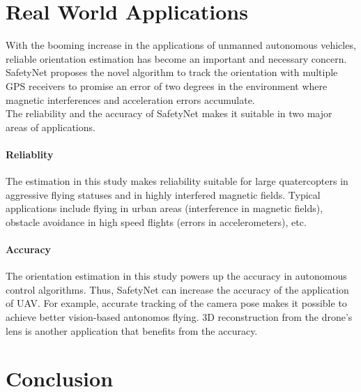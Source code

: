 \documentclass[journal,onecolumn]{IEEEtran}
\begin{document}
\section{Real World Applications}
With the booming increase in the applications of unmanned autonomous vehicles, reliable orientation estimation has become an important and necessary concern. SafetyNet proposes the novel algorithm to track the orientation with multiple GPS receivers to promise an error of two
degrees in the environment where magnetic interferences and acceleration errors accumulate.\\
The reliability and the accuracy of SafetyNet makes it suitable in two major areas of applications.\\
\paragraph{Reliablity} The estimation in this study makes reliability suitable for large quatercopters in aggressive flying statuses and in highly interfered
magnetic fields. Typical applications include flying in urban areas (interference in magnetic fields), obstacle avoidance in high
speed flights (errors in accelerometers), etc. \\
\paragraph{Accuracy} The orientation estimation in this study powers up the accuracy in autonomous control algorithms. Thus, SafetyNet can increase the accuracy of the application of UAV. For example, accurate
tracking of the camera pose makes it possible to achieve better vision-based antonomos flying. 3D reconstruction from the
drone’s lens is another application that benefits from the accuracy.
\section{Conclusion}
\end{document}
